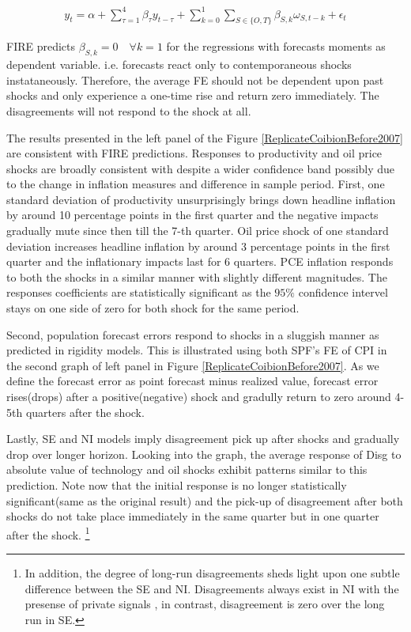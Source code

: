 \documentclass[]{article}
\begin{document}
\begin{eqnarray}\label{IRRegression}
y_{t}  = \alpha + \sum^4_{\tau=1} \beta_{\tau} y_{t-\tau} +  \sum^1_{k=0} \sum_{S \in \{O,T\}}\beta_{S,k}\omega_{S,t-k} + \epsilon_t 
\end{eqnarray}

FIRE predicts $\beta_{S,k}=0\quad \forall k=1$ for the regressions with forecasts moments as dependent variable. i.e. forecasts react only to contemporaneous shocks instataneously. Therefore, the average FE should not be dependent upon past shocks and  only experience a one-time rise and return zero immediately. The disagreements will not respond to the shock at all. 

The results  presented in the left panel of the Figure \ref{ReplicateCoibionBefore2007} are consistent with FIRE predictions. Responses to productivity and oil price shocks are broadly consistent with \citet{coibion2012can} despite a wider confidence band possibly due to the change in inflation measures and difference in sample period. First, one standard deviation of productivity unsurprisingly brings down headline inflation by around 10 percentage points  in the first quarter and the negative impacts gradually mute since then till the 7-th quarter. Oil price shock of one standard deviation increases headline inflation by around 3 percentage points in the first quarter and the inflationary impacts last for 6 quarters. PCE inflation responds to both the shocks in a similar manner with slightly different magnitudes. The responses coefficients are statistically significant as the $95\%$ confidence intervel stays on one side of zero for both shock for the same period. 

Second, population forecast errors respond to shocks in a sluggish manner as predicted in rigidity models. This is illustrated using both SPF's FE of CPI in the second graph of  left panel in Figure \ref{ReplicateCoibionBefore2007}. As we define the forecast error as point forecast minus realized value, forecast error rises(drops) after a positive(negative) shock and gradully return to zero around 4-5th quarters after the shock. 

Lastly, SE and NI models imply disagreement pick up after shocks and gradually drop over longer horizon.  Looking into the graph, the average response of Disg to absolute value of  technology and oil shocks exhibit patterns similar to this prediction. Note now that the initial response is no longer statistically significant(same as the original result) and the pick-up of disagreement after both shocks do not take place immediately in the same quarter but in one quarter after the shock. \footnote{In addition, the degree of long-run disagreements sheds light upon one subtle difference between the SE and NI. Disagreements always exist in NI with the presense of private signals , in contrast, disagreement is zero over the long run in SE. }
\end{document}
